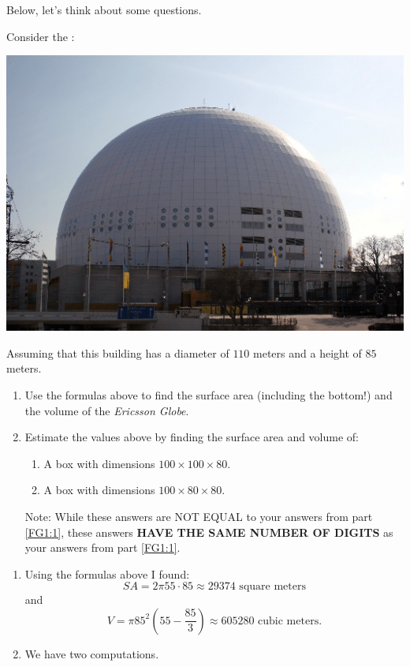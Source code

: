 \documentclass[nooutcomes,noauthor,handout,hints]{ximera}
\begin{document}
Below, let's think about some questions. 


\mynewpage





\begin{question}
  Consider the :
   \begin{center}
    \includegraphics[width=.4\textwidth]{dome.png} %
   \end{center}
   Assuming that this building has a diameter of $110$ meters and a
   height of $85$ meters.
   \begin{enumerate}
   \item \label{FG1:1} Use the formulas above to find the surface area
     (including the bottom!) and the volume of the \textit{Ericsson
     Globe}.
   \item Estimate the values above by finding the surface area and
     volume of:
     \begin{enumerate}
     \item A box with dimensions $100\times 100 \times 80$.
     \item A box with dimensions $100\times 80 \times 80$.
     \end{enumerate}
   Note: While these answers are NOT EQUAL to your answers from
   part \ref{FG1:1}, these answers \textbf{HAVE THE SAME NUMBER OF
     DIGITS} as your answers from part \ref{FG1:1}.
   \end{enumerate}
   \begin{freeResponse}
     \begin{enumerate}
     \item Using the formulas above I found:
       \[
       SA = 2\pi 55\cdot 85 \approx 29374 \text{ square meters}
       \]
       and
       \[
       V = \pi85^2 \left(55-\frac{85}{3}\right)\approx  605280 \text{ cubic meters}.
       \]
     \item We have two computations.
       \begin{enumerate}

\end{enumerate}
\end{enumerate}
\end{freeResponse}
\end{question}
\end{document}
